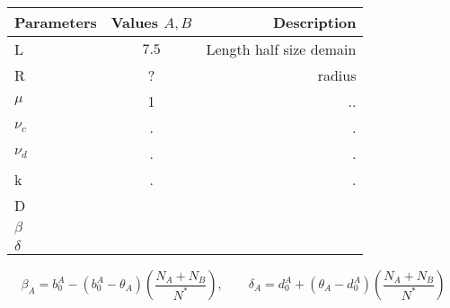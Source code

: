 	\begin{center}
	\begin{tabular}{ l | c | r }
		\hline
		Parameters & Values $A, B$ & Description \\ \hline
		L & $7.5$ & Length half size demain  \\ 
		R & ? &  radius \\
	
		$\mu$ & 1  & ..\\
		$\nu_c$  & .&  . \\
		$\nu_d$  & .&  . \\
		k & . & .\\
		D & & \\
		$\beta$ & & \\
		$\delta$ & & \\

		\hline
	\end{tabular}
\end{center}	

\begin{equation}
\beta_{A}=b_{0}^{A}-(b_{0}^{A}-\theta_{A})\left(\frac{N_A+N_B}{N^{*}}\right), \quad\quad \delta_{A}=d_{0}^{A}+(\theta_{A}-d_{0}^{A})\left(\frac{N_A+N_B}{N^{*}}\right)
\end{equation}

